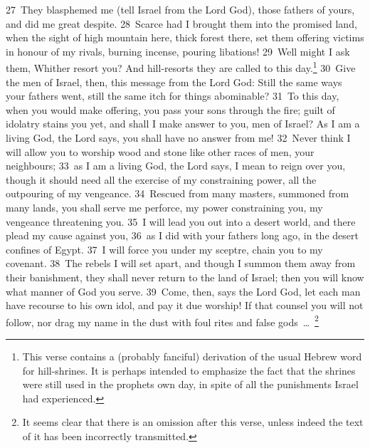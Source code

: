 \documentclass[10pt]{book} %
\begin{document}
\textcolor{benred8}{27}~They blasphemed me (tell Israel from the Lord God), those fathers of yours, and did me great despite. \textcolor{benred8}{28}~Scarce had I brought them into the promised land, when the sight of high mountain here, thick forest there, set them offering victims in honour of my rivals, burning incense, pouring libations! \textcolor{benred8}{29}~Well might I ask them, Whither resort you? And hill-resorts they are called to this day.\footnote[3]{This verse contains a (probably fanciful) derivation of the usual Hebrew word for \textasciigrave hill-shrines\textquotesingle . It is perhaps intended to emphasize the fact that the shrines were still used in the prophet\textquotesingle s own day, in spite of all the punishments Israel had experienced.}
\textcolor{benred8}{30}~Give the men of Israel, then, this message from the Lord God: Still the same ways your fathers went, still the same itch for things abominable? \textcolor{benred8}{31}~To this day, when you would make offering, you pass your sons through the fire; guilt of idolatry stains you yet, and shall I make answer to you, men of Israel? As I am a living God, the Lord says, you shall have no answer from me! \textcolor{benred8}{32}~Never think I will allow you to worship wood and stone like other races of men, your neighbours; \textcolor{benred8}{33}~as I am a living God, the Lord says, I mean to reign over you, though it should need all the exercise of my constraining power, all the outpouring of my vengeance. \textcolor{benred8}{34}~Rescued from many masters, summoned from many lands, you shall serve me perforce, my power constraining you, my vengeance threatening you. \textcolor{benred8}{35}~I will lead you out into a desert world, and there plead my cause against you, \textcolor{benred8}{36}~as I did with your fathers long ago, in the desert confines of Egypt. \textcolor{benred8}{37}~I will force you under my sceptre, chain you to my covenant. \textcolor{benred8}{38}~The rebels I will set apart, and though I summon them away from their banishment, they shall never return to the land of Israel; then you will know what manner of God you serve. \textcolor{benred8}{39}~Come, then, says the Lord God, let each man have recourse to his own idol, and pay it due worship! If that counsel you will not follow, nor drag my name in the dust with foul rites and false gods~\ldots\ \footnote[4]{It seems clear that there is an omission after this verse, unless indeed the text of it has been incorrectly transmitted.}
\end{document}
